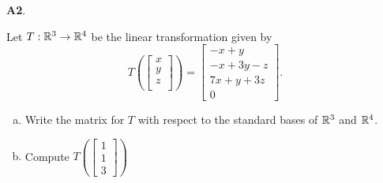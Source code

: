 \documentclass{article}
\newenvironment{problem}[1]
{
  \begin{flushleft}
  \textbf{#1}.
  \ignorespaces
}
{
  \end{flushleft}
}
\begin{document}
\begin{problem}{A2}
Let $T: \mathbb{R}^3\rightarrow \mathbb{R}^4$ be the linear transformation given by $$T\left(\begin{bmatrix} x \\ y \\ z \\  \end{bmatrix} \right) = \begin{bmatrix} -x+y \\ -x+3y-z \\ 7x+y+3z \\ 0 \end{bmatrix}.$$  
\begin{enumerate}[(a)]
\item Write the matrix for $T$ with respect to the standard bases of $\mathbb{R}^3$ and $\mathbb{R}^4$.
\item Compute \( T\left( \begin{bmatrix} 1 \\ 1 \\ 3 \end{bmatrix} \right) \)
\end{enumerate}
\end{problem}
\end{document}
